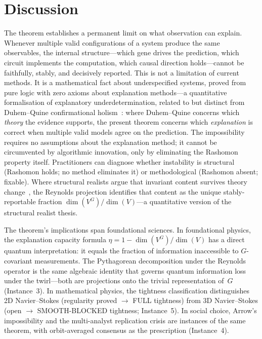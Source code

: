 \documentclass[11pt]{article}
\begin{document}

\section*{Discussion}

The theorem establishes a permanent limit on what observation can
explain.  Whenever multiple valid configurations of a system produce the
same observables, the internal structure---which gene drives the
prediction, which circuit implements the computation, which causal
direction holds---cannot be faithfully, stably, and decisively reported.
This is not a limitation of current methods.  It is a mathematical fact
about underspecified systems, proved from pure logic with zero axioms
about explanation methods---a quantitative formalisation of explanatory
underdetermination, related to but distinct from Duhem--Quine
confirmational holism~\citep{duhem1906aim,quine1951dogmas}: where
Duhem--Quine concerns which \emph{theory} the evidence supports, the
present theorem concerns which \emph{explanation} is correct when
multiple valid models agree on the prediction.  The impossibility requires
no assumptions about the explanation method; it cannot be circumvented
by algorithmic innovation, only by eliminating the Rashomon property
itself.  Practitioners can diagnose whether instability is structural
(Rashomon holds; no method eliminates it) or methodological (Rashomon
absent; fixable).  Where structural
realists argue that invariant content survives theory
change~\citep{ladyman2007every}, the Reynolds projection identifies
that content as the unique stably-reportable fraction
$\dim(V^G)/\dim(V)$---a quantitative version of the structural realist
thesis.

The theorem's implications span foundational sciences.  In foundational
physics, the explanation capacity formula $\eta = 1 - \dim(V^G)/\dim(V)$
has a direct quantum interpretation: it equals the fraction of
information inaccessible to $G$-covariant measurements.  The Pythagorean
decomposition under the Reynolds operator is the same algebraic identity
that governs quantum information loss under the
twirl---both are projections onto the trivial representation of~$G$
(Instance~3).  In
mathematical physics, the tightness classification distinguishes
2D Navier--Stokes (regularity proved $\to$ FULL tightness) from
3D Navier--Stokes (open $\to$ SMOOTH-BLOCKED tightness; Instance~5).
In social choice, Arrow's impossibility and the multi-analyst
replication crisis are instances of the same theorem, with orbit-averaged
consensus as the prescription (Instance~4).
\end{document}
